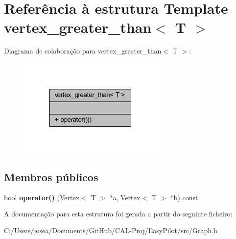 \hypertarget{structvertex__greater__than}{}\section{Referência à estrutura Template vertex\+\_\+greater\+\_\+than$<$ T $>$}
\label{structvertex__greater__than}


Diagrama de colaboração para vertex\+\_\+greater\+\_\+than$<$ T $>$\+:
\nopagebreak
\begin{figure}[H]
\begin{center}
\leavevmode
\includegraphics[width=205pt]{structvertex__greater__than__coll__graph}
\end{center}
\end{figure}
\subsection*{Membros públicos}
\begin{DoxyCompactItemize}
\item 
\hypertarget{structvertex__greater__than_af58940d572829488c2915ca53663631e}{}bool {\bfseries operator()} (\hyperlink{class_vertex}{Vertex}$<$ T $>$ $\ast$a, \hyperlink{class_vertex}{Vertex}$<$ T $>$ $\ast$b) const \label{structvertex__greater__than_af58940d572829488c2915ca53663631e}

\end{DoxyCompactItemize}


A documentação para esta estrutura foi gerada a partir do seguinte ficheiro\+:\begin{DoxyCompactItemize}
\item 
C\+:/\+Users/josea/\+Documents/\+Git\+Hub/\+C\+A\+L-\/\+Proj/\+Easy\+Pilot/src/Graph.\+h\end{DoxyCompactItemize}
